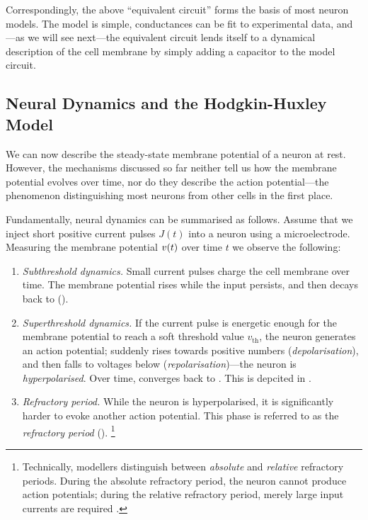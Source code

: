 Correspondingly, the above \enquote{equivalent circuit} forms the basis of most neuron models.
The model is simple, conductances can be fit to experimental data, and---as we will see next---the equivalent circuit lends itself to a dynamical description of the cell membrane by simply adding a capacitor to the model circuit.

\pagebreak

\subsection{Neural Dynamics and the Hodgkin-Huxley Model}
\label{sec:neural_dynamics}

We can now describe the steady-state membrane potential of a neuron at rest.
However, the mechanisms discussed so far neither tell us how the membrane potential evolves over time, nor do they describe the action potential---the phenomenon distinguishing most neurons from other cells in the first place.

Fundamentally, neural dynamics can be summarised as follows.
Assume that we inject short positive current pulses $J(t)$ into a neuron using a microelectrode.
Measuring the membrane potential ${v}(t)$ over time $t$ we observe the following:
\begin{enumerate}[1.]
	\setlength{\itemsep}{0.25em}
	\vspace*{-0.25em}
	\item \emph{Subthreshold dynamics.} Small current pulses charge the cell membrane over time. The membrane potential \vMem rises while the input persists, and then decays back to \vRest ().
	\item \emph{Superthreshold dynamics.} If the current pulse is energetic enough for the membrane potential to reach a soft threshold value $v_\mathrm{th}$, the neuron generates an action potential; \vMem suddenly rises towards positive numbers (\emph{depolarisation}), and then falls to voltages below \vRest (\emph{repolarisation})---the neuron is \emph{hyperpolarised}. Over time, \vMem converges back to  \vRest.  This is depcited in .
	\item \emph{Refractory period.} While the neuron is hyperpolarised, it is significantly harder to evoke another action potential. This phase is referred to as the \emph{refractory period} ().%
	\footnote{Technically, modellers distinguish between \emph{absolute} and \emph{relative} refractory periods. During the absolute refractory period, the neuron cannot produce action potentials; during the relative refractory period, merely large input currents are required \citep[Section~2.3.2]{izhikevich2007dynamical}.}
\end{enumerate}

